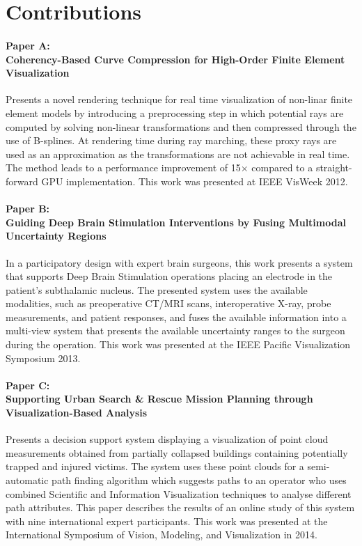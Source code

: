 \clearpg

\chapter*{Contributions}

\subsubsection{Paper A:\\Coherency-Based Curve Compression for High-Order Finite Element Visualization}
Presents a novel rendering technique for real time visualization of non-linar finite element models by introducing a preprocessing step in which potential rays are computed by solving non-linear transformations and then compressed through the use of B-splines.  At rendering time during ray marching, these proxy rays are used as an approximation as the transformations are not achievable in real time.  The method leads to a performance improvement of 15$\times$ compared to a straight-forward GPU implementation. This work was presented at IEEE VisWeek 2012.

\subsubsection{Paper B:\\Guiding Deep Brain Stimulation Interventions by Fusing Multimodal Uncertainty Regions}
In a participatory design with expert brain surgeons, this work presents a system that supports Deep Brain Stimulation operations placing an electrode in the patient's subthalamic nucleus.  The presented system uses the available modalities, such as preoperative CT/MRI scans, interoperative X-ray, probe measurements, and patient responses, and fuses the available information into a multi-view system that presents the available uncertainty ranges to the surgeon during the operation.  This work was presented at the IEEE Pacific Visualization Symposium 2013.

\subsubsection{Paper C:\\Supporting Urban Search \& Rescue Mission Planning through \\Visualization-Based Analysis}
Presents a decision support system displaying a  visualization of point cloud measurements obtained from partially collapsed buildings containing potentially trapped and injured victims.  The system uses these point clouds for a semi-automatic path finding algorithm which suggests paths to an operator who uses combined Scientific and Information Visualization techniques to analyse different path attributes.  This paper describes the results of an online study of this system with nine international expert participants.  This work was presented at the International Symposium of Vision, Modeling, and Visualization in 2014.

